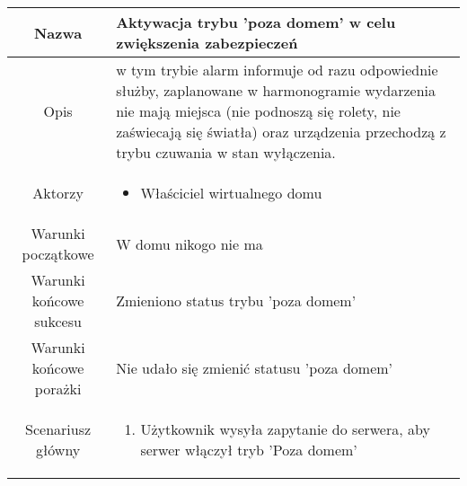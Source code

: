 \documentclass{article}
\begin{document}
\begin{enumerate}
\begin{enumerate}
				\begin{table}[H]
					\centering
					\begin{tabular}{|c|p{7cm}|}
						\hline
						Nazwa                   & Aktywacja trybu 'poza domem' w celu zwiększenia zabezpieczeń                                                                                                                                                                                                                           \\
						\hline
						Opis                    & w tym trybie alarm informuje od razu odpowiednie służby, zaplanowane w harmonogramie wydarzenia nie mają miejsca (nie podnoszą się rolety, nie zaświecają się światła) oraz urządzenia przechodzą z trybu czuwania w stan wyłączenia.                                                  \\
						\hline
						Aktorzy                 & \begin{itemize}\item Właściciel wirtualnego domu\end{itemize}                                                                                                                                                                                                                          \\
						\hline
						Warunki początkowe      & W domu nikogo nie ma                                                                                                                                                                                                                                                                   \\
						\hline
						Warunki końcowe sukcesu & Zmieniono status trybu 'poza domem'                                                                                                                                                                                                                                                    \\
						\hline
						Warunki końcowe porażki & Nie udało się zmienić statusu 'poza domem'                                                                                                                                                                                                                                             \\
						\hline
						Scenariusz główny       & \begin{enumerate}\item Użytkownik wysyła zapytanie do serwera, aby serwer włączył tryb 'Poza domem'


\end{enumerate}
\end{tabular}
\end{table}
\end{enumerate}
\end{enumerate}
\end{document}
